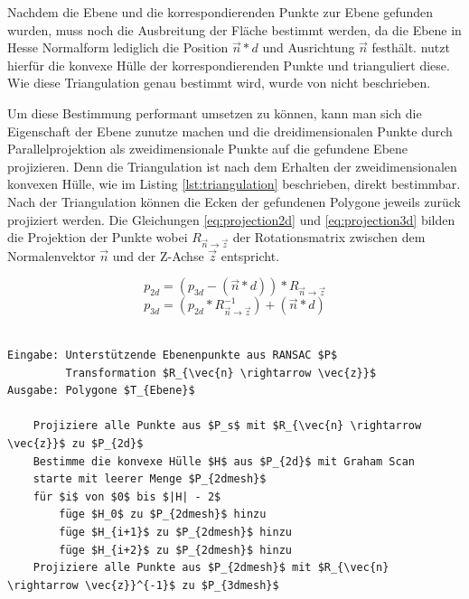 Nachdem die Ebene und die korrespondierenden Punkte zur Ebene gefunden wurden, muss noch die Ausbreitung der Fläche bestimmt werden, da die Ebene in Hesse Normalform lediglich die Position \(\vec{n} * d\) und Ausrichtung \(\vec{n}\) festhält. \citet{PlanarSurfaceMapping} nutzt hierfür die konvexe Hülle der korrespondierenden Punkte und trianguliert diese. Wie diese Triangulation genau bestimmt wird, wurde von \citet{PlanarSurfaceMapping} nicht beschrieben. 

Um diese Bestimmung performant umsetzen zu können, kann man sich die Eigenschaft der Ebene zunutze machen und die dreidimensionalen Punkte durch Parallelprojektion als zweidimensionale Punkte auf die gefundene Ebene projizieren. Denn die Triangulation ist nach dem Erhalten der zweidimensionalen konvexen Hülle, wie im Listing \ref{lst:triangulation} beschrieben, direkt bestimmbar. Nach der Triangulation können die Ecken der gefundenen Polygone jeweils zurück projiziert werden. Die Gleichungen \ref{eq:projection2d} und \ref{eq:projection3d} bilden die Projektion der Punkte wobei \(R_{\vec{n} \rightarrow \vec{z}}\) der Rotationsmatrix zwischen dem Normalenvektor \(\vec{n}\) und der Z-Achse \(\vec{z}\) entspricht.

\begin{equation} \label{eq:projection2d}
p_{2d} = (p_{3d} - (\vec{n}*d)) * R_{\vec{n} \rightarrow \vec{z}}
\end{equation}
\begin{equation} \label{eq:projection3d}
p_{3d} = (p_{2d} * R_{\vec{n} \rightarrow \vec{z}}^{-1}) + (\vec{n}*d)
\end{equation}

\begin{lstlisting}[mathescape,caption=Bestimmung der Ebenenausbreitung und Triangulation, label=lst:triangulation, float=htb]

Eingabe: Unterstützende Ebenenpunkte aus RANSAC $P$
         Transformation $R_{\vec{n} \rightarrow \vec{z}}$
Ausgabe: Polygone $T_{Ebene}$

    Projiziere alle Punkte aus $P_s$ mit $R_{\vec{n} \rightarrow \vec{z}}$ zu $P_{2d}$
    Bestimme die konvexe Hülle $H$ aus $P_{2d}$ mit Graham Scan
    starte mit leerer Menge $P_{2dmesh}$
    für $i$ von $0$ bis $|H| - 2$
        füge $H_0$ zu $P_{2dmesh}$ hinzu
        füge $H_{i+1}$ zu $P_{2dmesh}$ hinzu
        füge $H_{i+2}$ zu $P_{2dmesh}$ hinzu
    Projiziere alle Punkte aus $P_{2dmesh}$ mit $R_{\vec{n} \rightarrow \vec{z}}^{-1}$ zu $P_{3dmesh}$   
\end{lstlisting}

